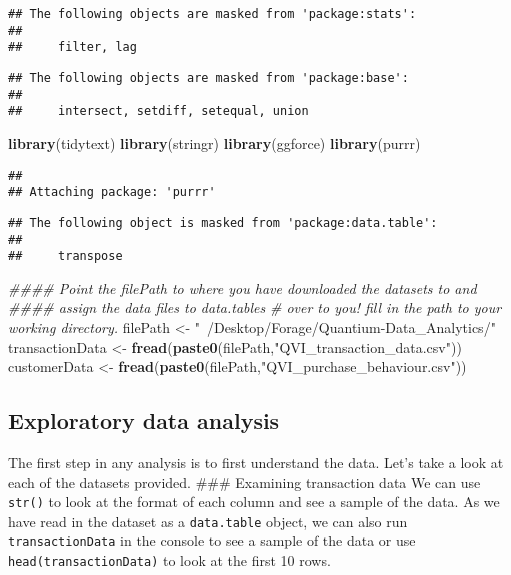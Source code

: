 \documentclass[]{article}
\newenvironment{Shaded}{\begin{snugshade}}{\end{snugshade}}
\newcommand{\CommentTok}[1]{\textcolor[rgb]{0.56,0.35,0.01}{\textit{#1}}}
\newcommand{\KeywordTok}[1]{\textcolor[rgb]{0.13,0.29,0.53}{\textbf{#1}}}
\newcommand{\NormalTok}[1]{#1}
\newcommand{\StringTok}[1]{\textcolor[rgb]{0.31,0.60,0.02}{#1}}
\begin{document}
\begin{verbatim}
## The following objects are masked from 'package:stats':
## 
##     filter, lag
\end{verbatim}

\begin{verbatim}
## The following objects are masked from 'package:base':
## 
##     intersect, setdiff, setequal, union
\end{verbatim}

\begin{Shaded}
\begin{Highlighting}[]
\KeywordTok{library}\NormalTok{(tidytext)}
\KeywordTok{library}\NormalTok{(stringr)}
\KeywordTok{library}\NormalTok{(ggforce)}
\KeywordTok{library}\NormalTok{(purrr)}
\end{Highlighting}
\end{Shaded}

\begin{verbatim}
## 
## Attaching package: 'purrr'
\end{verbatim}

\begin{verbatim}
## The following object is masked from 'package:data.table':
## 
##     transpose
\end{verbatim}

\begin{Shaded}
\begin{Highlighting}[]
\CommentTok{#### Point the filePath to where you have downloaded the datasets to and}
\CommentTok{#### assign the data files to data.tables}
\CommentTok{# over to you! fill in the path to your working directory.}
\NormalTok{filePath <-}\StringTok{ "~/Desktop/Forage/Quantium-Data_Analytics/"}
\NormalTok{transactionData <-}\StringTok{ }\KeywordTok{fread}\NormalTok{(}\KeywordTok{paste0}\NormalTok{(filePath,}\StringTok{"QVI_transaction_data.csv"}\NormalTok{))}
\NormalTok{customerData <-}\StringTok{ }\KeywordTok{fread}\NormalTok{(}\KeywordTok{paste0}\NormalTok{(filePath,}\StringTok{"QVI_purchase_behaviour.csv"}\NormalTok{))}
\end{Highlighting}
\end{Shaded}

\hypertarget{exploratory-data-analysis}{%
\subsection{Exploratory data analysis}\label{exploratory-data-analysis}}

The first step in any analysis is to first understand the data. Let's
take a look at each of the datasets provided. \#\#\# Examining
transaction data We can use \texttt{str()} to look at the format of each
column and see a sample of the data. As we have read in the dataset as a
\texttt{data.table} object, we can also run \texttt{transactionData} in
the console to see a sample of the data or use
\texttt{head(transactionData)} to look at the first 10 rows.
\end{document}
